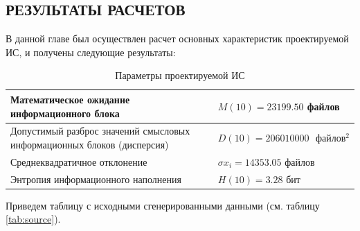 \documentclass[a4paper,14pt]{extarticle}
\begin{document}
\subsection{РЕЗУЛЬТАТЫ РАСЧЕТОВ}

В данной главе был осуществлен расчет основных характеристик
проектируемой ИС, и получены следующие результаты:

\begin{table}[h!]
	\centering
	\caption{Параметры проектируемой ИС}
	\begin{tabular}{|p{0.6\linewidth}|p{0.4\linewidth}|}
		\hline
		Математическое ожидание информационного блока & $M(10) = 23199.50$ файлов\\\hline
		Допустимый разброс значений смысловых
		информационных блоков (дисперсия) & $D(10) = 206010000\mbox{ }файлов^2$ \\\hline
		Среднеквадратичное отклонение & $\sigma x_i=14353.05\mbox{ файлов}$	\\\hline
		Энтропия информационного наполнения & $H(10) = 3.28 $ бит \\\hline
	\end{tabular}
\end{table}
Приведем таблицу с исходными сгенерированными данными (см. таблицу \ref{tab:source}).
\end{document}
